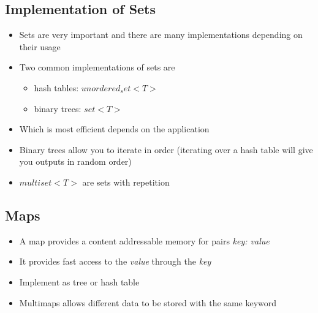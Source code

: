 
\begin{slide}
\section[-1]{Implementation of Sets}

\begin{PauseHighLight}
  \begin{itemize}
  \item Sets are very important and there are many implementations
    depending on their usage\pause
  \item Two common implementations of sets are
    \begin{itemize}
    \item hash tables: \jl$unordered_set<T>$
    \item binary trees: \jl$set<T>$ \pause
    \end{itemize}
  \item Which is most efficient depends on the application\pause
  \item Binary trees allow you to iterate in order\pause{} (iterating
    over a hash table will give you outputs in random order)\pauseb
  \item \jl$multiset<T>$ are sets with repetition\pause
  \end{itemize}
\end{PauseHighLight}
\end{slide}




\begin{slide}
\section{Maps}

\begin{PauseHighLight}
  \begin{itemize}
  \item A map provides a content addressable memory for pairs
  \textit{key: value}\pause
  \item It provides fast access to the \textit{value} through the
    \textit{key}\pause
  \item Implement as tree or hash table\pause
  \item Multimaps allows different data to be stored with the same
    keyword\pause
  \end{itemize}
\end{PauseHighLight}
\end{slide}



